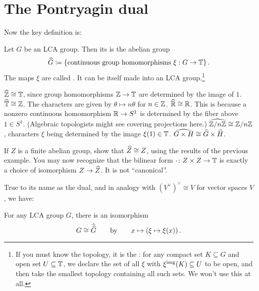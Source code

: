 \section{The Pontryagin dual}
Now the key definition is:
\begin{definition}
	Let $G$ be an LCA group.
	Then its  is the abelian group
	\[ \widehat G \coloneqq \left\{ \text{continuous group homomorphisms }
			\xi : G \to \mathbb T \right\}. \]
	The maps $\xi$ are called .
	It can be itself made into an LCA group.\footnote{If you must
		know the topology, it is the :
		for any compact set $K \subseteq G$
		and open set $U \subseteq \mathbb T$,
		we declare the set of all $\xi$ with $\xi^{\text{img}}(K) \subseteq U$ to be open,
		and then take the smallest topology
		containing all such sets. We won't use this at all.}
\end{definition}
\begin{example}
	\listhack
	\begin{itemize}
		\ii $\widehat{\mathbb Z} \cong \mathbb T$,
		since group homomorphisms $\mathbb Z \to \mathbb T$ are determined by the image of $1$.
		\ii $\widehat{\mathbb T} \cong \mathbb Z$.
		The characters are given by $\theta \mapsto n\theta$ for $n \in \mathbb Z$.
		\ii $\widehat{\mathbb R} \cong \mathbb R$.
		This is because a nonzero continuous homomorphism
		$\mathbb R \to S^1$ is determined by the fiber above $1 \in S^1$.
		(Algebraic topologists might see covering projections here.)
		\ii $\widehat{\mathbb Z/n\mathbb Z} \cong \mathbb Z/n\mathbb Z$,
		characters $\xi$ being determined by the image $\xi(1) \in \mathbb T$.
		\ii $\widehat{G \times H} \cong \widehat G \times \widehat H$.
	\end{itemize}
\end{example}
\begin{exercise}
	If $Z$ is a finite abelian group, show that $\widehat Z \cong Z$,
	using the results of the previous example.
	You may now recognize that the bilinear form
	$\cdot \colon Z \times Z \to \mathbb T$
	is exactly a choice of isomorphism $Z \to \widehat Z$.
	It is not ``canonical''.
\end{exercise}

True to its name as the dual,
and in analogy with $(V^\vee)^\vee \cong V$ for vector spaces $V$, we have:
\begin{theorem}
	For any LCA group $G$, there is an isomorphism
	\[ G \cong \widehat{\widehat G} \qquad \text{by} \qquad
		x \mapsto \left( \xi \mapsto \xi(x) \right). \]
\end{theorem}

